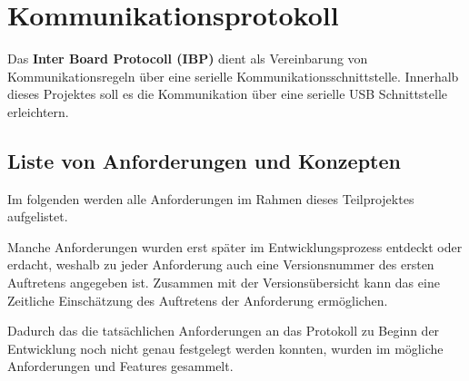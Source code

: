 
\section{Kommunikationsprotokoll}
Das \textbf{Inter Board Protocoll (IBP)} dient als Vereinbarung von Kommunikationsregeln über eine serielle Kommunikationsschnittstelle.
Innerhalb dieses Projektes soll es die Kommunikation über eine serielle USB Schnittstelle erleichtern.

\subsection{Liste von Anforderungen und Konzepten}

Im folgenden werden alle Anforderungen im Rahmen dieses Teilprojektes aufgelistet.\par
Manche Anforderungen wurden erst später im Entwicklungsprozess entdeckt oder erdacht, weshalb zu jeder Anforderung auch eine Versionsnummer des ersten Auftretens angegeben ist. Zusammen mit der Versionsübersicht kann das eine Zeitliche Einschätzung des Auftretens der Anforderung ermöglichen.

Dadurch das die tatsächlichen Anforderungen an das Protokoll zu Beginn der Entwicklung noch nicht genau festgelegt werden konnten, wurden im mögliche Anforderungen und Features gesammelt.

